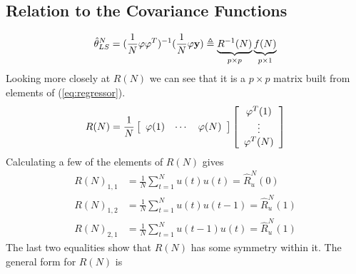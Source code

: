\documentclass[lecture,12pt,]{pcms-l}
\begin{document}
\subsection{Relation to the Covariance Functions}
$$\hat{\theta}_{LS}^N = (\frac{1}{N}\mathbf{\varphi\varphi}^T)^{-1}(\frac{1}{N}\mathbf{\varphi y}) \triangleq \underbrace{R^{-1}(N)}_{p\times p} \underbrace{f(N)}_{p\times 1}$$
Looking more closely at $R(N)$ we can see that it is a $p\times p$ matrix built from elements of (\ref{eq:regressor}).
$$R(N) = \frac{1}{N}\left[\begin{array}{c c c} \varphi(1) & \cdots & \varphi(N) \end{array}\right]
\left[\begin{array}{c} \varphi^T(1) \\ \vdots \\ \varphi^T(N) \end{array}\right]$$
Calculating a few of the elements of $R(N)$ gives
\begin{align*}
R(N)_{1,1} &= \frac{1}{N}\sum_{t=1}^Nu(t)u(t) = \hat{R}_u^N(0) \\
R(N)_{1,2} &= \frac{1}{N}\sum_{t=1}^Nu(t)u(t-1) = \hat{R}_u^N(1) \\
R(N)_{2,1} &= \frac{1}{N}\sum_{t=1}^Nu(t-1)u(t) = \hat{R}_u^N(1)
\end{align*}
The last two equalities show that $R(N)$ has some symmetry within it. The general form for $R(N)$ is
\end{document}
